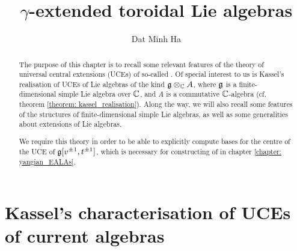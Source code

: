

\setcounter{chapter}{-1}
\setcounter{section}{-1}


\newcommand{\toroidal}{\t}
\newcommand{\extendedtoroidal}{\hat{\t}}
\newcommand{\simpleroots}{\mathbb{I}}
\renewcommand{\positive}{+}
\renewcommand{\negative}{-}
\newcommand{\divzero}{\der_{\gamma}(A)}



    \title{\texorpdfstring{$\gamma$}{}-extended toroidal Lie algebras}
    
    \author{Dat Minh Ha}
    \maketitle
    
    {
      \hypersetup{} 
      \dominitoc
      \tableofcontents %
    }


    \newpage

    \listoftodos

    \newpage

    

    \newpage
    
    \chapter{Kassel's characterisation of UCEs of current algebras}
        \begin{abstract}
            The purpose of this chapter is to recall some relevant features of the theory of universal central extensions (UCEs) of so-called . Of special interest to us is Kassel's realisation of UCEs of Lie algebras of the kind $\g \tensor_{\bbC} A$, where $\mathfrak{g}$ is a finite-dimensional simple Lie algebra over $\mathbb{C}$, and $A$ is a commutative $\mathbb{C}$-algebra (cf. theorem \ref{theorem: kassel_realisation}). Along the way, we will also recall some features of the structures of finite-dimensional simple Lie algebras, as well as some generalities about extensions of Lie algebras.
            
            We require this theory in order to be able to explicitly compute bases for the centre of the UCE of $\mathfrak{g}[v^{\pm 1}, t^{\pm 1}]$, which is necessary for constructing of  in chapter \ref{chapter: yangian_EALAs}. 
        \end{abstract}

